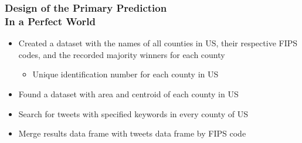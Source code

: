 \documentclass[xcolor=dvipsnames]{beamer}
\begin{document}

\begin{frame}
\frametitle{Design of the Primary Prediction \\ \small In a Perfect World}
\begin{itemize}
	\item Created a dataset with the names of all counties in US, their respective FIPS codes, and the recorded majority winners for each county 
	\begin{itemize}
	\item Unique identification number for each county in US
	\end{itemize}
	\pause 
	\item Found a dataset with area and centroid of each county in US
	\pause
	\item Search for tweets with specified keywords in every county of US
\begin{center}
	
\end{center} \pause
	\item Merge results data frame with tweets data frame by FIPS code
	\end{itemize}
\end{frame}
\end{document}
